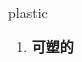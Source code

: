 
\begin{frame}
{\huge plastic}
\begin{center}
\begin{enumerate}\Large
  \item \textbf{可塑的}
\end{enumerate}
\end{center}
\end{frame}
